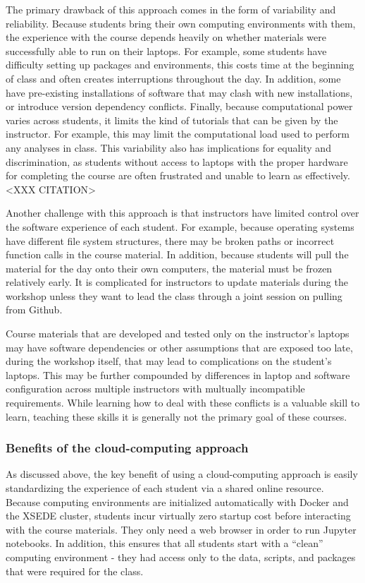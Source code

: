 The primary drawback of this approach comes in the form of variability and
reliability. Because students bring their own computing environments with them,
the experience with the course depends heavily on whether materials were
successfully able to run on their laptops. For example, some students have
difficulty setting up packages and environments, this costs time at the
beginning of class and often creates interruptions throughout the day. In
addition, some have pre-existing installations of software that may clash with
new installations, or introduce version dependency conflicts. Finally, because
computational power varies across students, it limits the kind of tutorials that
can be given by the instructor. For example, this may limit the computational
load used to perform any analyses in class. This variability also has
implications for equality and discrimination, as students without access to
laptops with the proper hardware for completing the course are often frustrated
and unable to learn as effectively. <XXX CITATION>

Another challenge with this approach is that instructors have limited control
over the software experience of each student. For example, because operating
systems have different file system structures, there may be broken paths or
incorrect function calls in the course material. In addition, because students
will pull the material for the day onto their own computers, the material must
be frozen relatively early. It is complicated for instructors to update
materials during the workshop unless they want to lead the class through a joint
session on pulling from Github.

Course materials that are developed and tested only on the instructor's laptops
may have software dependencies or other assumptions that are exposed too late,
during the workshop itself, that may lead to complications on the student's
laptops. This may be further compounded by differences in laptop and software
configuration across multiple instructors with multually incompatible
requirements. While learning how to deal with these conflicts is a valuable
skill to learn, teaching these skills it is generally not the primary goal of
these courses.

\subsubsection{Benefits of the cloud-computing approach}

As discussed above, the key benefit of using a cloud-computing approach is
easily standardizing the experience of each student via a shared online
resource. Because computing environments are initialized automatically with
Docker and the XSEDE cluster, students incur virtually zero startup cost before
interacting with the course materials. They only need a web browser in order to
run Jupyter notebooks. In addition, this ensures that all students start with a
``clean'' computing environment - they had access only to the data, scripts, and
packages that were required for the class.

